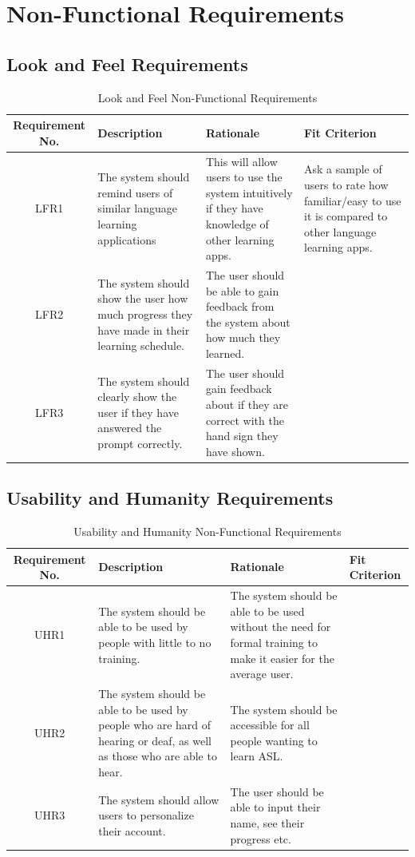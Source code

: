 \documentclass[12pt, titlepage]{article}
\begin{document}
\section{Non-Functional Requirements}

\subsection{Look and Feel Requirements}

\begin{table}[H]
\caption{Look and Feel Non-Functional Requirements}
\noindent \begin{tabular}{| c | p{3cm}| p{3cm}| p{3cm}|}
\hline 
\textbf{Requirement No.} & \textbf{Description} & \textbf{Rationale} & \textbf{Fit Criterion}\\
\hline
LFR1 & The system should remind users of similar language learning applications & This will allow users to use the system intuitively if they have knowledge of other learning apps. & Ask a sample of users to rate how familiar/easy to use it is compared to other language learning apps. \\
\hline
LFR2 & The system should show the user how much progress they have made in their learning schedule. & The user should be able to gain feedback from the system about how much they learned. & \\
\hline
LFR3 & The system should clearly show the user if they have answered the prompt correctly. & The user should gain feedback about if they are correct with the hand sign they have shown. & \\
\bottomrule
\end{tabular}
\end{table}

\subsection{Usability and Humanity Requirements}

\begin{table}[H]
\caption{Usability and Humanity Non-Functional Requirements}
\noindent \begin{tabular}{| c | p{3cm}| p{3cm}| p{3cm}|}
\hline 
\textbf{Requirement No.} & \textbf{Description} & \textbf{Rationale} & \textbf{Fit Criterion}\\
\hline
UHR1 & The system should be able to be used by people with little to no training. & The system should be able to be used without the need for formal training to make it easier for the average user. & \\
\hline
UHR2 & The system should be able to be used by people who are hard of hearing or deaf, as well as those who are able to hear. & The system should be accessible for all people wanting to learn ASL. & \\
\hline
UHR3 & The system should allow users to personalize their account. & The user should be able to input their name, see their progress etc. & \\
\bottomrule
\end{tabular}
\end{table}
\end{document}
